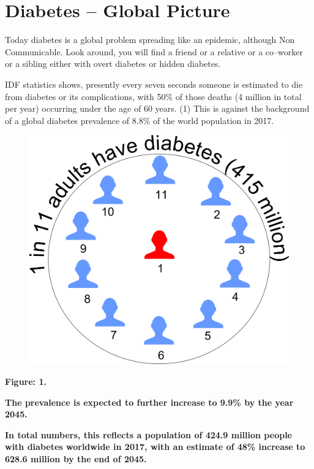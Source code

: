 \chapter{Diabetes – Global Picture}\label{chap9}

Today diabetes is a global problem spreading like an epidemic, although Non Communicable. Look around, you will find a friend or a relative or a co–worker or a sibling either with overt diabetes or hidden diabetes.

IDF statistics shows, presently every seven seconds someone is estimated to die from diabetes or its complications, with 50\% of those deaths (4 million in total per year) occurring under the age of 60 years. (1) This is against the background of a global diabetes prevalence of 8.8\% of the world population in 2017.

\begin{figure}
\includegraphics{images/034.jpg}
\end{figure}

\textbf{Figure: 1.}

\item \textbf{The prevalence is expected to further increase to 9.9\% by the year 2045.}

 \item \textbf{In total numbers, this reflects a population of 424.9 million people with diabetes worldwide in 2017, with an estimate of 48\% increase to 628.6 million by the end of 2045.}

